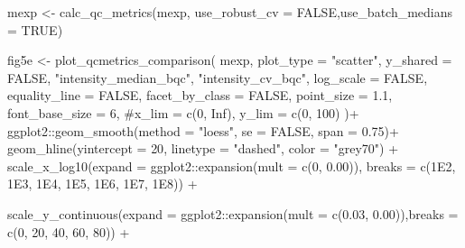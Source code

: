 \documentclass[
  letterpaper,
  DIV=11,
  numbers=noendperiod]{scrartcl}
\newenvironment{Shaded}{\begin{snugshade}}{\end{snugshade}}
\newcommand{\AttributeTok}[1]{\textcolor[rgb]{0.40,0.45,0.13}{#1}}
\newcommand{\CommentTok}[1]{\textcolor[rgb]{0.37,0.37,0.37}{#1}}
\newcommand{\ConstantTok}[1]{\textcolor[rgb]{0.56,0.35,0.01}{#1}}
\newcommand{\DecValTok}[1]{\textcolor[rgb]{0.68,0.00,0.00}{#1}}
\newcommand{\FloatTok}[1]{\textcolor[rgb]{0.68,0.00,0.00}{#1}}
\newcommand{\FunctionTok}[1]{\textcolor[rgb]{0.28,0.35,0.67}{#1}}
\newcommand{\NormalTok}[1]{\textcolor[rgb]{0.00,0.23,0.31}{#1}}
\newcommand{\OtherTok}[1]{\textcolor[rgb]{0.00,0.23,0.31}{#1}}
\newcommand{\SpecialCharTok}[1]{\textcolor[rgb]{0.37,0.37,0.37}{#1}}
\newcommand{\StringTok}[1]{\textcolor[rgb]{0.13,0.47,0.30}{#1}}
\begin{document}
\begin{Shaded}
\begin{Highlighting}[]
\NormalTok{mexp }\OtherTok{\textless{}{-}}  \FunctionTok{calc\_qc\_metrics}\NormalTok{(mexp, }\AttributeTok{use\_robust\_cv =} \ConstantTok{FALSE}\NormalTok{,}\AttributeTok{use\_batch\_medians =} \ConstantTok{TRUE}\NormalTok{)}

\NormalTok{fig5e }\OtherTok{\textless{}{-}} \FunctionTok{plot\_qcmetrics\_comparison}\NormalTok{(}
\NormalTok{  mexp,}
  \AttributeTok{plot\_type =} \StringTok{"scatter"}\NormalTok{,}
  \AttributeTok{y\_shared =} \ConstantTok{FALSE}\NormalTok{,}
  \StringTok{"intensity\_median\_bqc"}\NormalTok{,}
  \StringTok{"intensity\_cv\_bqc"}\NormalTok{,}
  \AttributeTok{log\_scale =} \ConstantTok{FALSE}\NormalTok{,}
  \AttributeTok{equality\_line =} \ConstantTok{FALSE}\NormalTok{,}
  \AttributeTok{facet\_by\_class =} \ConstantTok{FALSE}\NormalTok{,}
   \AttributeTok{point\_size =} \FloatTok{1.1}\NormalTok{,}
  \AttributeTok{font\_base\_size =} \DecValTok{6}\NormalTok{,}
  \CommentTok{\#x\_lim = c(0, Inf),}
  \AttributeTok{y\_lim =} \FunctionTok{c}\NormalTok{(}\DecValTok{0}\NormalTok{, }\DecValTok{100}\NormalTok{) }
\NormalTok{)}\SpecialCharTok{+} 
\NormalTok{ggplot2}\SpecialCharTok{::}\FunctionTok{geom\_smooth}\NormalTok{(}\AttributeTok{method =} \StringTok{"loess"}\NormalTok{, }\AttributeTok{se =} \ConstantTok{FALSE}\NormalTok{, }\AttributeTok{span =} \FloatTok{0.75}\NormalTok{)}\SpecialCharTok{+}
\FunctionTok{geom\_hline}\NormalTok{(}\AttributeTok{yintercept =} \DecValTok{20}\NormalTok{, }\AttributeTok{linetype =} \StringTok{"dashed"}\NormalTok{, }\AttributeTok{color =} \StringTok{"grey70"}\NormalTok{) }\SpecialCharTok{+}
\FunctionTok{scale\_x\_log10}\NormalTok{(}\AttributeTok{expand =}\NormalTok{ ggplot2}\SpecialCharTok{::}\FunctionTok{expansion}\NormalTok{(}\AttributeTok{mult =} \FunctionTok{c}\NormalTok{(}\DecValTok{0}\NormalTok{, }\FloatTok{0.00}\NormalTok{)),}
             \AttributeTok{breaks =} \FunctionTok{c}\NormalTok{(}\FloatTok{1E2}\NormalTok{, }\FloatTok{1E3}\NormalTok{, }\FloatTok{1E4}\NormalTok{, }\FloatTok{1E5}\NormalTok{, }\FloatTok{1E6}\NormalTok{, }\FloatTok{1E7}\NormalTok{, }\FloatTok{1E8}\NormalTok{)) }\SpecialCharTok{+}

\FunctionTok{scale\_y\_continuous}\NormalTok{(}\AttributeTok{expand =}\NormalTok{ ggplot2}\SpecialCharTok{::}\FunctionTok{expansion}\NormalTok{(}\AttributeTok{mult =} \FunctionTok{c}\NormalTok{(}\FloatTok{0.03}\NormalTok{, }\FloatTok{0.00}\NormalTok{)),}\AttributeTok{breaks =} \FunctionTok{c}\NormalTok{(}\DecValTok{0}\NormalTok{, }\DecValTok{20}\NormalTok{, }\DecValTok{40}\NormalTok{, }\DecValTok{60}\NormalTok{, }\DecValTok{80}\NormalTok{)) }\SpecialCharTok{+}


\end{Highlighting}
\end{Shaded}
\end{document}
